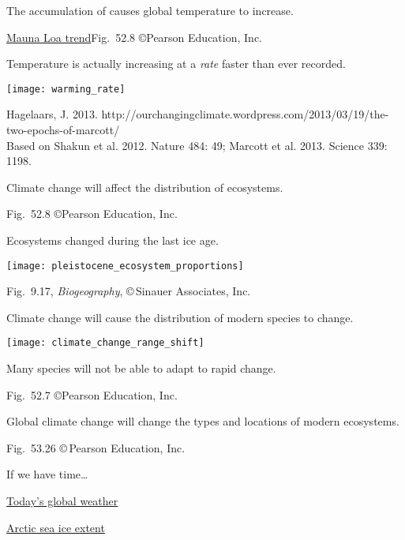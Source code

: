 \documentclass[t]{beamer}
\begin{document}
%
{
\begin{frame}[b]{The accumulation of  causes global temperature to increase.}

	\tiny \href{https://gml.noaa.gov/ccgg/trends/}{Mauna Loa trend}\hfill Fig.~52.8 \copyright Pearson Education, Inc.
\end{frame}
}
%

\begin{frame}[t]{Temperature is actually increasing at a \emph{rate} faster than ever recorded.}
	
	\vspace*{-0.5\baselineskip}
	
	{\centering\texttt{[image: warming\_rate]}\par%
	}
	
	\vfilll
	
	\tiny Hagelaars, J. 2013. http://ourchangingclimate.wordpress.com/2013/03/19/the-two-epochs-of-marcott/\\
Based on Shakun et al. 2012. Nature 484: 49; Marcott et al. 2013. Science 339: 1198. 

\end{frame}
%
{
	\begin{frame}[b]{Climate change will affect the distribution of ecosystems.}
		
		\hfill \tiny Fig.~52.8 \copyright Pearson Education, Inc.
	\end{frame}
}
%
\begin{frame}{Ecosystems changed during the last ice age.}

	\texttt{[image: pleistocene\_ecosystem\_proportions]}

	\vfilll
	
	\hfill \tiny Fig.~9.17, \emph{Biogeography}, \copyright\,Sinauer Associates, Inc.
\end{frame}
%
\begin{frame}[t]{Climate change will cause the distribution of modern species to change.}

	\texttt{[image: climate\_change\_range\_shift]}\par
	
	\hangpara Many species will not be able to adapt to rapid change.
	
	\vfilll
	
	\hfill \tiny Fig.~52.7 \copyright Pearson Education, Inc.

\end{frame}
%
{
\begin{frame}[b]{Global climate change will change the types and locations of modern ecosystems.}

	\hfill \tiny Fig.~53.26 \copyright\,Pearson Education, Inc.
\end{frame}
}
%

\begin{frame}{If we have time\dots}

\href{http://cci-reanalyzer.org/wx/DailySummary/}{Today's global weather}\bigskip

\href{http://nsidc.org/arcticseaicenews/charctic-interactive-sea-ice-graph/}{Arctic sea ice extent}
\end{frame}
\end{document}
